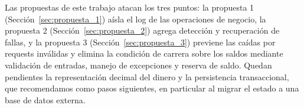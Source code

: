         Las propuestas de este trabajo atacan los tres puntos: la
        propuesta 1 (Sección~\ref{sec:propuesta_1}) aísla el log de las operaciones de
        negocio, la propuesta 2 (Sección~\ref{sec:propuesta_2}) agrega detección y
        recuperación de fallas, y la propuesta 3 (Sección~\ref{sec:propuesta_3}) previene
        las caídas por requests inválidas y elimina la condición de carrera sobre los saldos
        mediante validación de entradas, manejo de excepciones y reserva de saldo. Quedan
        pendientes la representación decimal del dinero y la persistencia transaccional,
        que recomendamos como pasos siguientes, en particular al migrar el estado a una base
        de datos externa.
